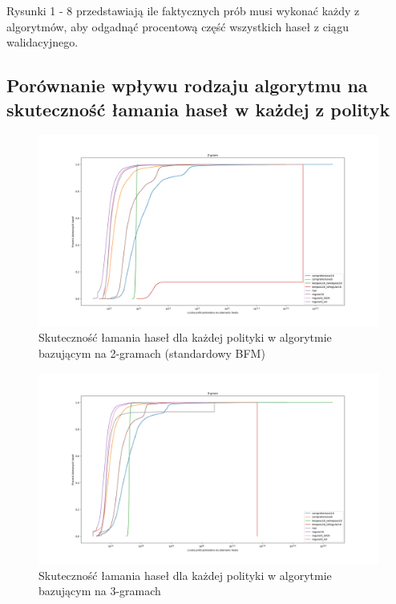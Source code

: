 \documentclass{article}
\begin{document}
	Rysunki 1 - 8 przedstawiają ile faktycznych prób musi wykonać każdy z algorytmów, aby odgadnąć procentową część wszystkich haseł z ciągu walidacyjnego.

	\subsection{Porównanie wpływu rodzaju algorytmu na skuteczność łamania haseł w każdej z polityk}
	\begin{figure}[H]
		\centering
		\includegraphics[width=15cm, keepaspectratio]{2-gram}
		\caption{Skuteczność łamania haseł dla każdej polityki w algorytmie bazującym na 2-gramach (standardowy BFM)}
	\end{figure}

	\begin{figure}[H]
		\centering
		\includegraphics[width=15cm, keepaspectratio]{3-gram}
		\caption{Skuteczność łamania haseł dla każdej polityki w algorytmie bazującym na 3-gramach}
	\end{figure}
\end{document}
